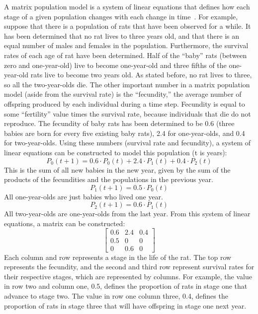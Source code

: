 \documentclass{article}
\begin{document}
    \hspace{\parindent}A matrix population model is a system of linear equations that defines how each stage of a given population changes with each change in time~\cite{shoemaker_lab_2024}.
    For example, suppose that there is a population of rats that have been observed for a while.
    It has been determined that no rat lives to three years old, and that there is an equal number of males and females in the population.
    Furthermore, the survival rates of each age of rat have been determined.
    Half of the ``baby'' rats (between zero and one-year-old) live to become one-year-old and three fifths of the one-year-old rats live to become two years old.
    As stated before, no rat lives to three, so all the two-year-olds die.
    The other important number in a matrix population model (aside from the survival rate) is the ``fecundity,'' the average number of offspring produced by each individual during a time step.
    Fecundity is equal to some ``fertility'' value times the survival rate, because individuals that die do not reproduce.
    The fecundity of baby rats has been determined to be 0.6 (three babies are born for every five existing baby rats), 2.4 for one-year-olds, and 0.4 for two-year-olds.
    Using these numbers (survival rate and fecundity), a system of linear equations can be constructed to model this population (t is years):
    \begin{equation}
        P_0(t+1)=0.6 \cdot P_0(t)+2.4 \cdot P_1(t)+0.4 \cdot P_2(t)\label{eq:equation1}
    \end{equation}
    \noindent This is the sum of all new babies in the new year, given by the sum of the products of the fecundities and the populations in the previous year.
    \begin{equation}
        P_1(t+1)=0.5 \cdot P_0(t)\label{eq:equation2}
    \end{equation}
    \noindent All one-year-olds are just babies who lived one year.
    \begin{equation}
        P_2(t+1)=0.6 \cdot P_1(t)\label{eq:equation3}
    \end{equation}
    \noindent All two-year-olds are one-year-olds from the last year.
    From this system of linear equations, a matrix can be constructed:
    \begin{equation}
        \begin{bmatrix}
            0.6 & 2.4 & 0.4 \\
            0.5 & 0   & 0   \\
            0   & 0.6 & 0
        \end{bmatrix}\label{eq:equation4}
    \end{equation}
    Each column and row represents a stage in the life of the rat.
    The top row represents the fecundity, and the second and third row represent survival rates for their respective stages, which are represented by columns.
    For example, the value in row two and column one, 0.5, defines the proportion of rats in stage one that advance to stage two.
    The value in row one column three, 0.4, defines the proportion of rats in stage three that will have offspring in stage one next year.
\end{document}
